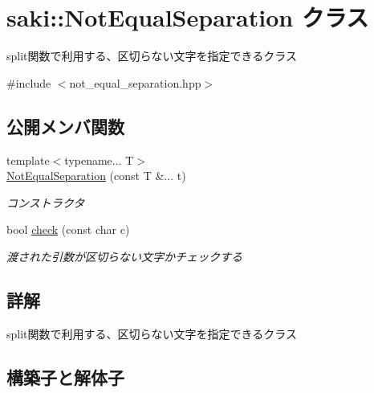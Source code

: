 \hypertarget{classsaki_1_1_not_equal_separation}{}\section{saki\+:\+:Not\+Equal\+Separation クラス}
\label{classsaki_1_1_not_equal_separation}


split関数で利用する、区切らない文字を指定できるクラス  




{\ttfamily \#include $<$not\+\_\+equal\+\_\+separation.\+hpp$>$}

\subsection*{公開メンバ関数}
\begin{DoxyCompactItemize}
\item 
{\footnotesize template$<$typename... T$>$ }\\\mbox{\hyperlink{classsaki_1_1_not_equal_separation_a9b68345fdaf631703ffa3774c2447c90}{Not\+Equal\+Separation}} (const T \&... t)
\begin{DoxyCompactList}\small\item\em コンストラクタ \end{DoxyCompactList}\item 
bool \mbox{\hyperlink{classsaki_1_1_not_equal_separation_ae0f0b0efa166ce1edcec289a8c04e549}{check}} (const char c)
\begin{DoxyCompactList}\small\item\em 渡された引数が区切らない文字かチェックする \end{DoxyCompactList}\end{DoxyCompactItemize}


\subsection{詳解}
split関数で利用する、区切らない文字を指定できるクラス 

\subsection{構築子と解体子}
\mbox{\label{classsaki_1_1_not_equal_separation_a9b68345fdaf631703ffa3774c2447c90}} 
